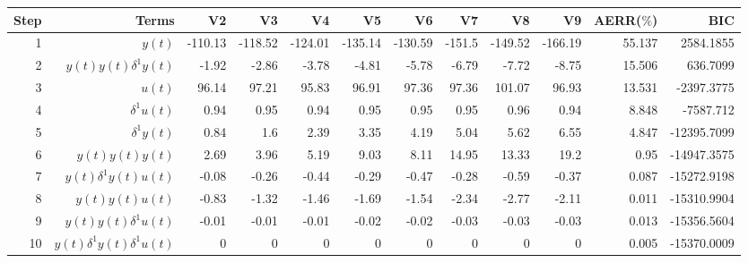 \begin{tabular}{rrrrrrrrrrrr}
Step & Terms & V2 & V3 & V4 & V5 & V6 & V7 & V8 & V9 & AERR($\%$) & BIC \\ 
\hline 
1 & $y(t)$ & -110.13 & -118.52 & -124.01 & -135.14 & -130.59 & -151.5 & -149.52 & -166.19 & 55.137 & 2584.1855 \\ 
2 & $y(t)y(t)\delta^1 y(t)$ & -1.92 & -2.86 & -3.78 & -4.81 & -5.78 & -6.79 & -7.72 & -8.75 & 15.506 & 636.7099 \\ 
3 & $u(t)$ & 96.14 & 97.21 & 95.83 & 96.91 & 97.36 & 97.36 & 101.07 & 96.93 & 13.531 & -2397.3775 \\ 
4 & $\delta^1 u(t)$ & 0.94 & 0.95 & 0.94 & 0.95 & 0.95 & 0.95 & 0.96 & 0.94 & 8.848 & -7587.712 \\ 
5 & $\delta^1 y(t)$ & 0.84 & 1.6 & 2.39 & 3.35 & 4.19 & 5.04 & 5.62 & 6.55 & 4.847 & -12395.7099 \\ 
6 & $y(t)y(t)y(t)$ & 2.69 & 3.96 & 5.19 & 9.03 & 8.11 & 14.95 & 13.33 & 19.2 & 0.95 & -14947.3575 \\ 
7 & $y(t)\delta^1 y(t)u(t)$ & -0.08 & -0.26 & -0.44 & -0.29 & -0.47 & -0.28 & -0.59 & -0.37 & 0.087 & -15272.9198 \\ 
8 & $y(t)y(t)u(t)$ & -0.83 & -1.32 & -1.46 & -1.69 & -1.54 & -2.34 & -2.77 & -2.11 & 0.011 & -15310.9904 \\ 
9 & $y(t)y(t)\delta^1 u(t)$ & -0.01 & -0.01 & -0.01 & -0.02 & -0.02 & -0.03 & -0.03 & -0.03 & 0.013 & -15356.5604 \\ 
10 & $y(t)\delta^1 y(t)\delta^1 u(t)$ & 0 & 0 & 0 & 0 & 0 & 0 & 0 & 0 & 0.005 & -15370.0009 \\ 
\hline 
\end{tabular}